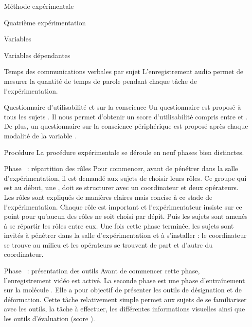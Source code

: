 \documentclass[myfrancais,ngerman,english,french]{mythesis}
\begin{document}
\begin{mychapter}{Méthode expérimentale}
\begin{mysection}{Quatrième expérimentation}
\begin{mysubsection}{Variables}
\begin{mysubsubsection}{Variables dépendantes}
\begin{myparagraph}{ Temps des communications verbales par sujet}
						L'enregistrement audio permet de mesurer la quantité de temps de parole pendant chaque tâche de l'expérimentation.
					\end{myparagraph}
					\begin{myparagraph}{ Questionnaire d'utilisabilité et sur la conscience}
						Un questionnaire  est proposé à tous les sujets .
						Il nous permet d'obtenir un score d'utilisabilité compris entre  et .
						De plus, un questionnaire sur la conscience périphérique est proposé après chaque modalité de la variable .
					\end{myparagraph}
				\end{mysubsubsection}
			\end{mysubsection}
			\begin{mysubsection}{Procédure}
				La procédure expérimentale se déroule en neuf phases bien distinctes.
				\begin{myparagraph}{Phase~ : répartition des rôles}
					Pour commencer, avant de pénétrer dans la salle d'expérimentation, il est demandé aux sujets de choisir leurs rôles.
					Ce groupe qui est au début, une , doit se structurer avec un coordinateur et deux opérateurs.
					Les rôles sont expliqués de manières claires mais concise à ce stade de l'expérimentation.
					Chaque rôle est important et l'expérimentateur insiste sur ce point pour qu'aucun des rôles ne soit choisi par dépit.
					Puis les sujets sont amenés à se répartir les rôles entre eux.
					Une fois cette phase terminée, les sujets sont invités à pénétrer dans la salle d'expérimentation et à s'installer : le coordinateur se trouve au milieu et les opérateurs se trouvent de part et d'autre du coordinateur.
				\end{myparagraph}
				\begin{myparagraph}{Phase~ : présentation des outils}
					Avant de commencer cette phase, l'enregistrement vidéo est activé.
					La seconde phase est une phase d'entraînement sur la molécule \myTRPCAGE.
					Elle a pour objectif de présenter les outils de désignation et de déformation.
					Cette tâche relativement simple permet aux sujets de se familiariser avec les outils, la tâche à effectuer, les différentes informations visuelles ainsi que les outils d'évaluation (score ).

\end{myparagraph}
\end{mysubsection}
\end{mysection}
\end{mychapter}
\end{document}
